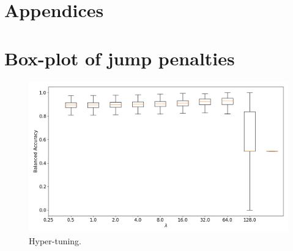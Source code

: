 \newpage
\section{Appendices}
\appendix

\section{Box-plot of jump penalties}
\label{appendix:box_plot}

\begin{figure}[H] 
    \centering
    \includegraphics[width=1\textwidth]{analysis/model_convergence/images/jump_penalties_box.png}
    \caption{Hyper-tuning.}
\end{figure}

